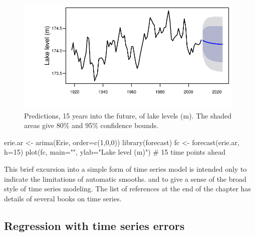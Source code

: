 \begin{figure}
\begin{Schunk}


\centerline{\includegraphics[width=0.98\textwidth]{figs/12-Erie-fcast-1} }

\end{Schunk}
\caption{Predictions, 15 years into the future, of lake levels
  (m). The shaded areas give 80\% and 95\% confidence bounds.
}\label{Erie-fcastplot}
\end{figure}

\begin{marginfigure}[-4.5cm]
\begin{Schunk}
\begin{Sinput}
erie.ar <- arima(Erie,
            order=c(1,0,0))
library(forecast)
fc <- forecast(erie.ar,
               h=15)
plot(fc, main="",
     ylab="Lake level (m)")
  # 15 time points ahead
\end{Sinput}
\end{Schunk}
\end{marginfigure}

This brief excursion into a simple form of time series model is
intended only to indicate the limitations of automatic smooths.  and
to give a sense of the broad style of time series modeling.  The list
of references at the end of the chapter has details of several books
on time series.

\subsection{Regression with time series errors}

